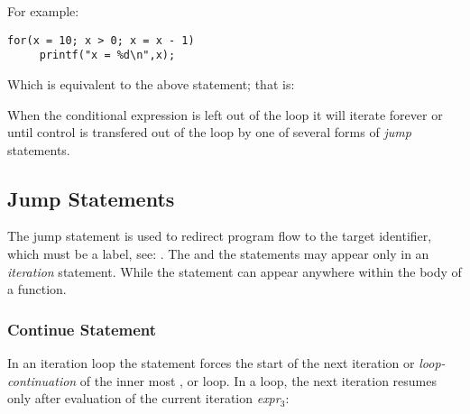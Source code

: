 For example:

\begin{production}
\begin{verbatim}
for(x = 10; x > 0; x = x - 1)
     printf("x = %d\n",x);
\end{verbatim}
\end{production}

Which is equivalent to the above  statement; that is:

\begin{production}
\end{production}


When the conditional expression is left out of the
 loop it will iterate forever or until control is transfered
out of the loop by one of several forms of {\it jump} statements.

\subsection{Jump Statements}
\label{sec:JumpStatements}

\begin{production}
\end{production}

The  jump statement is used to redirect program flow to the target identifier,
which must be a label, see: .   The  and the
 statements may appear only in an {\it iteration} statement.
While the  statement can appear anywhere within the
body of a  function.

\subsubsection{Continue Statement}
\label{sec:ContinueStatement}
In an iteration loop the  statement forces the start of
the next iteration or {\it loop-continuation} of the inner most
,  or  loop. In a  loop, the
next iteration resumes only after evaluation of the current
iteration {\it expr$_3$}:

